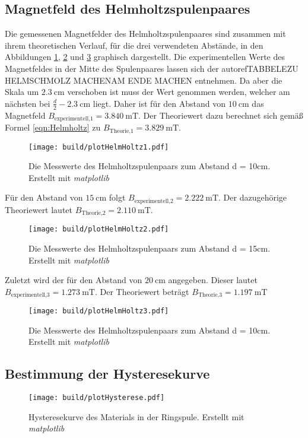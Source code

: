 \subsection{Magnetfeld des Helmholtzspulenpaares}
\label{subsec:A_Helmholtz}
Die gemessenen Magnetfelder des Helmholtzspulenpaares sind zusammen mit ihrem theoretischen Verlauf, für die drei verwendeten Abstände, in den Abbildungen \ref{fig:PlotHH1}, \ref{fig:PlotHH2} und \ref{fig:PlotHH3} 
graphisch dargestellt. Die experimentellen Werte des Magnetfeldes in der Mitte des Spulenpaares lassen sich der autoref{TABBELEZU HELMSCHMOLZ MACHENAM ENDE MACHEN} entnehmen. Da aber die Skala um $2.3\:\unit{\centi\metre}$ verschoben ist muss der Wert
genommen werden, welcher am nächsten bei $\frac{d}{2} - 2.3\:\unit{\centi\metre}$ liegt. Daher ist für den Abstand von $10\:\unit{\centi\metre}$ das Magnetfeld $B_{\text{experimentell,1}} = 3.840\:\unit{\milli\tesla}$.
Der Theoriewert dazu berechnet sich gemäß Formel \eqref{eqn:Helmholtz} zu $B_{\text{Theorie,1}} = 3.829\:\unit{\milli\tesla}$.
\begin{figure}[H]
    \centering
    \caption{Die Messwerte des Helmholtzspulenpaars zum Abstand d = 10cm. Erstellt mit \textit{matplotlib} \cite{matplotlib}}
    \label{fig:PlotHH1}
    \texttt{[image: build/plotHelmHoltz1.pdf]}
\end{figure}
Für den Abstand von $15\:\unit{\centi\metre}$ folgt $B_{\text{experimentell,2}} = 2.222\:\unit{\milli\tesla}$. Der dazugehörige Theoriewert lautet $B_{\text{Theorie,2}} = 2.110\:\unit{\milli\tesla}$.
\begin{figure}[H]
    \centering
    \caption{Die Messwerte des Helmholtzspulenpaars zum Abstand d = 15cm. Erstellt mit \textit{matplotlib} \cite{matplotlib}}
    \label{fig:PlotHH2}
    \texttt{[image: build/plotHelmHoltz2.pdf]}
\end{figure}
Zuletzt wird der für den Abstand von $20\:\unit{\centi\metre}$ angegeben. Dieser lautet $B_{\text{experimentell,3}} = 1.273\:\unit{\milli\tesla}$. Der Theoriewert beträgt $B_{\text{Theorie,3}} = 1.197\:\unit{\milli\tesla}$
\begin{figure}[H]
    \centering
    \caption{Die Messwerte des Helmholtzspulenpaars zum Abstand d = 10cm. Erstellt mit \textit{matplotlib} \cite{matplotlib}}
    \label{fig:PlotHH3}
    \texttt{[image: build/plotHelmHoltz3.pdf]}
\end{figure}
\subsection{Bestimmung der Hysteresekurve}
\label{A_Hysterese}

\begin{figure}
    \centering
    \caption{Hysteresekurve des Materials in der Ringspule. Erstellt mit \textit{matplotlib} \cite{matplotlib}}
    \label{fig:PlotHysterese}
    \texttt{[image: build/plotHysterese.pdf]}
\end{figure}
